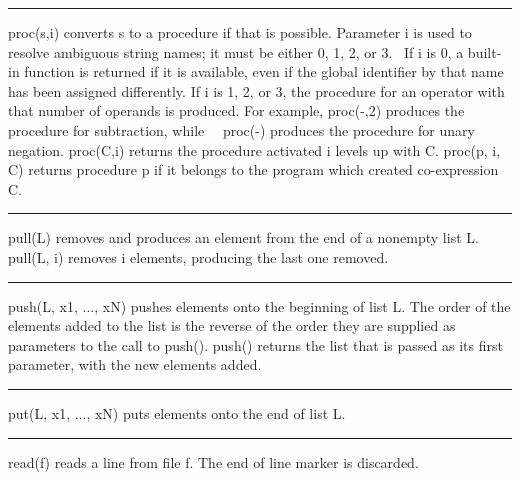 \bigskip\hrule\vspace{0.1cm}

\noindent
{}\textsf{proc(s,i)} converts \textsf{s} to a procedure
if that is possible. Parameter \textsf{i} is used to resolve ambiguous
string names; it must be either 0, 1, 2, or 3. \ If \textsf{i} is 0, a
built-in function is returned if it is available, even if the global
identifier by that name has been assigned differently. If \textsf{i} is
1, 2, or 3, the procedure for an operator with that number of operands
is produced. For example,
\textsf{proc({\textquotedbl}-{\textquotedbl},2)} produces the procedure
for subtraction, while
\ \ \textsf{proc({\textquotedbl}-{\textquotedbl})} produces the
procedure for unary negation. \textsf{proc(C,i)} returns the procedure
activated \textsf{i} levels up with \textsf{C}. \textsf{proc(p, i, C)}
returns procedure \textsf{p} if it belongs to the program which created
co-expression \textsf{C}.

\bigskip\hrule\vspace{0.1cm}

\noindent
{}\textsf{pull(L)} removes and produces an element from the
end of a nonempty list \textsf{L.} \textsf{pull(L, i)} removes
\textsf{i} elements, producing the last one removed.

\bigskip\hrule\vspace{0.1cm}

\noindent
\textsf{push(L, x1, ..., xN)} pushes elements onto the beginning of list
\textsf{L}. The order of the elements added to the list is the reverse
of the order they are supplied as parameters to the call to
\textsf{push()}. \textsf{push()} returns the list that is
passed as its first parameter, with the new elements added.

\hrule\vspace{0.1cm}

\noindent
{}\textsf{put(L, x1, ..., xN)} puts elements onto the end of
list \textsf{L}.

\bigskip\hrule\vspace{0.1cm}

\noindent
{}\textsf{read(f)} reads a line from file \textsf{f}. The
end of line marker is discarded.

